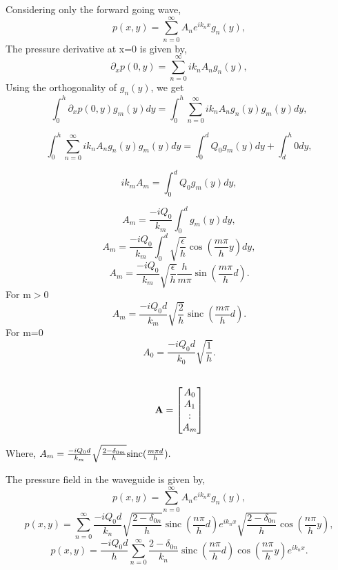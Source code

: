 \documentclass{beamer}
\begin{document}
 \begin{frame}
Considering only the forward going wave,
\[ p(x,y)=\sum_{n=0}^{\infty}A_n e^{ik_nx} g_n(y),\] 
The pressure derivative at x=0 is given by,
\[\partial_xp(0,y)=\sum_{n=0}^{\infty}ik_nA_n g_n(y),\]
Using the orthogonality of $g_n(y)$, we get
\[\int_0^h \partial_xp(0,y)g_m(y)dy=\int_{0}^{h}\sum_{n=0}^{\infty}ik_nA_n g_n(y)g_m(y) dy,\]

\[\int_{0}^{h}\sum_{n=0}^{\infty}ik_nA_n g_n(y)g_m(y) dy= \int_0^d Q_0 g_m(y)dy + \int_{d}^{h}0 dy,\]

\[ik_mA_m=\int_0^d Q_0 g_m(y)dy,\]

 \end{frame}

 \begin{frame}

\[A_m=\frac{-iQ_0}{k_m}\int_0^d g_m(y)dy,\]
\[A_m=\frac{-iQ_0}{k_m}\int_0^d \sqrt{\frac{\epsilon}{h}}\cos(\frac{m\pi}{h}y)dy,\]
\[A_m=\frac{-iQ_0}{k_m}\sqrt{\frac{\epsilon}{h}}\frac{h}{m\pi}\sin(\frac{m\pi}{h}d).\]
For m$>$0\[A_m=\frac{-iQ_0 d}{k_m}\sqrt{\frac{2}{h}}\operatorname{sinc}(\frac{m\pi}{h}d).\] 
For m=0   \[A_0=\frac{-iQ_0 d}{k_0}\sqrt{\frac{1}{h}}.\]       
\\
\begin{minipage}{0.25\textwidth}
\[\bold{A}=\begin{bmatrix}A_0\\ A_1\\ :\\ A_m\\ \end{bmatrix}\] 
\end{minipage}
\hfill
\begin{minipage}
{0.6\textwidth}
Where, $A_m=  \frac{-iQ_0 d}{k_m}\sqrt{\frac{2-\delta_{0m}}{h}}\bold{\operatorname{sinc}}{(\frac{m \pi d}{h})} .$\end{minipage}
 \end{frame}
\begin{frame}
The pressure field in the waveguide is given by,
\[p(x,y)=\sum_{n=0}^{\infty}A_n e^{ik_nx} g_n(y),\]
\[p(x,y)=\sum_{n=0}^{\infty}\frac{-iQ_0 d}{k_n}\sqrt{\frac{2-\delta_{0n}}{h}}\operatorname{sinc}(\frac{n\pi}{h}d) e^{ik_nx} \sqrt{\frac{2-\delta_{0n}}{h}}\cos(\frac{n\pi}{h}y),\]
\[p(x,y)=\frac{-iQ_0 d}{h}\sum_{n=0}^{\infty}\frac{2-\delta_{0n}}{k_n}\operatorname{sinc}(\frac{n\pi}{h}d) \cos(\frac{n\pi}{h}y)e^{ik_nx}.\]
\\
\end{frame}
\end{document}
